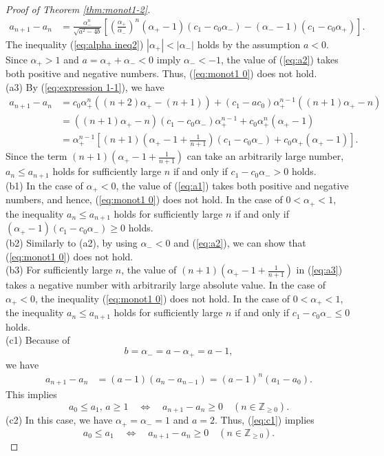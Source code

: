\documentclass[a4paper,11pt,reqno]{amsart}
\theoremstyle{plain}
\theoremstyle{definition}
\begin{document}
\begin{proof}[Proof of Theorem \ref{thm:monot1-2}]
\begin{align}
a_{n+1}-a_{n}
   &=
   \frac{\alpha _{-}^{n}}{\sqrt{a^{2}-4b}}
   \left[\left(\frac{\alpha _{+}}{\alpha _{-}}\right)^{n}(\alpha _{+}-1)(c_{1}-c_{0}\alpha _{-})-(\alpha _{-}-1)(c_{1}-c_{0}\alpha _{+})\right] .
\end{align}
The inequality (\ref{eq:alpha ineq2}) $|\alpha _{+}|< |\alpha _{-}|$ holds by the assumption $a<0$. 
Since $\alpha _{+}>1$ and $a=\alpha _{+}+\alpha _{-}<0$ imply $\alpha _{-}<-1$, 
the value of (\ref{eq:a2}) takes both positive and negative numbers. 
Thus, (\ref{eq:monot1 0}) does not hold. 
\\
(a3)
By (\ref{eq:expression 1-1}), we have 
\begin{align}
a_{n+1}-a_{n}
   &=
   c_{0}\alpha_{+} ^{n}((n+2)\alpha_{+} -(n+1))
   +(c_{1}-ac_{0})\alpha_{+} ^{n-1}((n+1)\alpha_{+} -n) \nonumber \\
   &=
   ((n+1)\alpha_{+} -n)(c_{1}-c_{0}\alpha _{-})\alpha_{+} ^{n-1}
   +c_{0}\alpha_{+} ^{n}(\alpha_{+} -1) \nonumber \\
\label{eq:a3}
   &=
   \alpha _{+}^{n-1}\left[ (n+1)\left( \alpha _{+}-1+\frac{1}{n+1}\right)(c_{1}-c_{0}\alpha _{-})+c_{0}\alpha _{+}(\alpha _{+}-1)\right].
\end{align}
Since the term $(n+1)\left( \alpha _{+}-1+\frac{1}{n+1}\right)$ can take an arbitrarily large number, 
$a_{n}\leq a_{n+1}$ holds for sufficiently large $n$ if and only if $c_{1}-c_{0}\alpha _{-}> 0$ holds. 
\\
(b1)
In the case of $\alpha _{+}<0$, the value of (\ref{eq:a1}) takes both positive and negative numbers, 
and hence, (\ref{eq:monot1 0}) does not hold. 
In the case of $0<\alpha _{+}<1$, the inequality $a_{n}\leq a_{n+1}$ holds for sufficiently large $n$ if and only if 
$(\alpha _{+}-1)(c_{1}-c_{0}\alpha _{-})\geq 0$ holds. 
\\
(b2)
Similarly to (a2), by using $\alpha _{-}<0$ and (\ref{eq:a2}), we can show that (\ref{eq:monot1 0}) does not hold. 
\\
(b3)
For sufficiently large $n$, 
the value of $(n+1)\left(\alpha _{+}-1+\frac{1}{n+1}\right)$ in (\ref{eq:a3}) takes
a negative number with arbitrarily large absolute value. 
In the case of $\alpha _{+}<0$, the inequality (\ref{eq:monot1 0}) does not hold. 
In the case of $0<\alpha _{+}<1$, the inequality $a_{n}\leq a_{n+1}$ holds for sufficiently large $n$ if and only if 
$c_{1}-c_{0}\alpha _{-}\leq 0$ holds. 
\\
(c1)
Because of
$$
b=\alpha _{-}=a-\alpha _{+}=a-1, 
$$
we have 
\begin{align}
\label{eq:c1}
a_{n+1}-a_{n}
   &=
   (a-1)(a_{n}-a_{n-1})
   =
   (a-1)^{n}(a_{1}-a_{0}).
\end{align}
This implies 
$$
a_{0}\leq a_{1}, \, a\geq 1 \quad \Leftrightarrow \quad a_{n+1}-a_{n}\geq 0 \quad (n \in \mathbb{Z}_{\geq 0}).
$$
(c2)
In this case, we have $\alpha _{+}=\alpha _{-}=1$ and $a=2$. 
Thus, (\ref{eq:c1}) implies  
$$
a_{0}\leq a_{1} \quad \Leftrightarrow \quad a_{n+1}-a_{n}\geq 0 \quad (n \in \mathbb{Z}_{\geq 0}).
$$
\end{proof}
\end{document}
